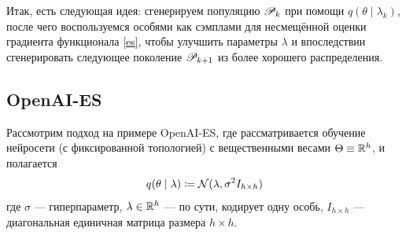 \begin{theorem}
\end{theorem}

Итак, есть следующая идея: сгенерируем популяцию $\mathscr{P}_k$ при помощи $q(\theta \mid \lambda_k)$, после чего воспользуемся особями как сэмплами для несмещённой оценки градиента функционала \eqref{es}, чтобы улучшить параметры $\lambda$ и впоследствии сгенерировать следующее поколение $\mathscr{P}_{k+1}$ из более хорошего распределения.



\subsection{OpenAI-ES}

Рассмотрим подход на примере OpenAI-ES, где рассматривается обучение нейросети (с фиксированной топологией) с вещественными весами $\Theta \equiv \mathbb{R}^h$, и полагается
\begin{equation}\label{openai_es}
q(\theta \mid \lambda) \coloneqq \mathcal{N}(\lambda, \sigma^2I_{h \times h})
\end{equation}
где $\sigma$ --- гиперпараметр, $\lambda \in \mathbb{R}^h$ --- по сути, кодирует одну особь, $I_{h \times h}$ --- диагональная единичная матрица размера $h \times h$.

